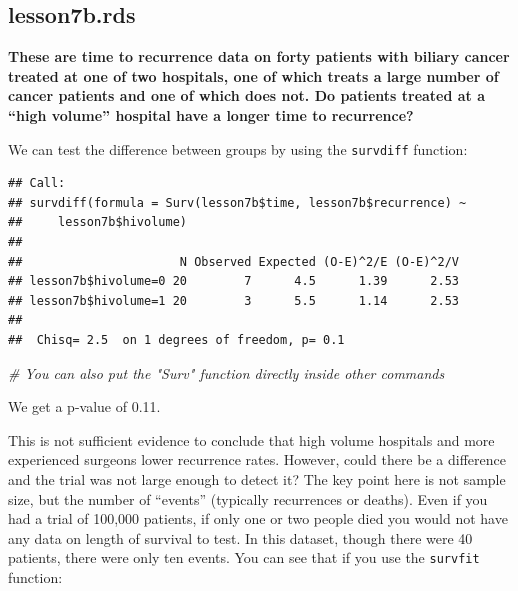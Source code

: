 \documentclass[]{book}
\newenvironment{Shaded}{\begin{snugshade}}{\end{snugshade}}
\newcommand{\CommentTok}[1]{\textcolor[rgb]{0.56,0.35,0.01}{\textit{#1}}}
\newcommand{\KeywordTok}[1]{\textcolor[rgb]{0.13,0.29,0.53}{\textbf{#1}}}
\newcommand{\NormalTok}[1]{#1}
\newcommand{\OperatorTok}[1]{\textcolor[rgb]{0.81,0.36,0.00}{\textbf{#1}}}
\newcommand{\StringTok}[1]{\textcolor[rgb]{0.31,0.60,0.02}{#1}}
\begin{document}
\hypertarget{lesson7b.rds}{%
\subsection{lesson7b.rds}\label{lesson7b.rds}}

\textbf{These are time to recurrence data on forty patients with biliary
cancer treated at one of two hospitals, one of which treats a large
number of cancer patients and one of which does not. Do patients treated
at a ``high volume'' hospital have a longer time to recurrence?}

We can test the difference between groups by using the \texttt{survdiff}
function:

\begin{Shaded}
\end{Shaded}

\begin{verbatim}
## Call:
## survdiff(formula = Surv(lesson7b$time, lesson7b$recurrence) ~ 
##     lesson7b$hivolume)
## 
##                      N Observed Expected (O-E)^2/E (O-E)^2/V
## lesson7b$hivolume=0 20        7      4.5      1.39      2.53
## lesson7b$hivolume=1 20        3      5.5      1.14      2.53
## 
##  Chisq= 2.5  on 1 degrees of freedom, p= 0.1
\end{verbatim}

\begin{Shaded}
\begin{Highlighting}[]
\CommentTok{# You can also put the "Surv" function directly inside other commands}
\end{Highlighting}
\end{Shaded}

We get a p-value of 0.11.

This is not sufficient evidence to conclude that high volume hospitals
and more experienced surgeons lower recurrence rates. However, could
there be a difference and the trial was not large enough to detect it?
The key point here is not sample size, but the number of ``events''
(typically recurrences or deaths). Even if you had a trial of 100,000
patients, if only one or two people died you would not have any data on
length of survival to test. In this dataset, though there were 40
patients, there were only ten events. You can see that if you use the
\texttt{survfit} function:
\end{document}
